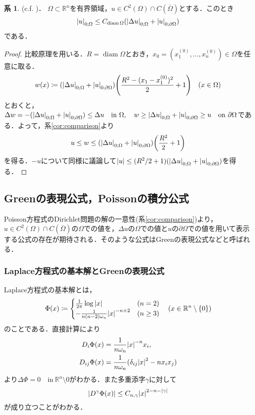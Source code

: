 \documentclass[a4paper]{ltjsarticle}
\newcommand{\Rset}{\mathbb{R}}
\newcommand{\Om}{\Omega}
\newcommand{\pOm}{\partial\Omega}
\newcommand{\Ombar}{\overline{\Omega}}
\newcommand{\inn}{\quad\text{in}\ }
\newcommand{\on}{\quad \text{on}\ }
\newcommand{\1}{\mathbbm{1}}
\DeclareMathOperator{\diam}{\mathrm{diam}}
\numberwithin{equation}{section}
\theoremstyle{definition}
\newtheorem{cor}[thm]{系}
\begin{document}
\begin{cor}\label{cor:l_infty_estimate}(c.f. \cite[Lemma 1.14]{fr})．
    $\Om\subset\Rset^n$を有界領域，$u\in C^2(\Om)\cap C(\Ombar)$とする．このとき
    \begin{equation}
        \abs{u}_{0;\Om}\leq C_{\diam\Om}(\abs{\Delta u}_{0;\Om}+\abs{u}_{0;\pOm})
    \end{equation}
    である．
\end{cor}
\begin{proof}
    比較原理を用いる．$R=\diam\Om$とおき，$x_0=(x^{(0)}_1,\ldots,x^{(0)}_n)\in\Om$を任意に取る．
    \begin{equation}
        w(x)\coloneqq (\abs{\Delta u}_{0;\Om}+\abs{u}_{0;\pOm})\qty(\frac{R^2-(x_1-x_1^{(0)})^2}{2}+1)\quad (x\in\Om)
    \end{equation}
    とおくと，$\Delta w=-(\abs{\Delta u}_{0;\Om}+\abs{u}_{0;\pOm})\leq \Delta u\inn\Omega,\quad w\geq \abs{\Delta u}_{0;\Om}+\abs{u}_{0;\pOm}\geq u\on \pOm$である．よって，系\ref{cor:comparison}より
    \begin{equation}
        u\leq w\leq (\abs{\Delta u}_{0;\Om}+\abs{u}_{0;\pOm})\qty(\frac{R^2}{2}+1)
    \end{equation}
    を得る．$-u$について同様に議論して$\abs{u}\leq (R^2/2+1)(\abs{\Delta u}_{0;\Om}+\abs{u}_{0;\pOm})$を得る．
\end{proof}
\subsection{Greenの表現公式，Poissonの積分公式}

Poisson方程式のDirichlet問題の解の一意性(系\ref{cor:comparison})より，$u\in C^2(\Omega)\cap C(\Ombar)$の$\Om$での値を，$\Delta u$の$\Om$での値と$u$の$\pOm$での値を用いて表示する公式の存在が期待される．そのような公式はGreenの表現公式などと呼ばれる．
\subsubsection{Laplace方程式の基本解とGreenの表現公式}
Laplace方程式の基本解とは，
\begin{equation}
    \Phi(x)\coloneqq \begin{cases}
        \frac{1}{2\pi}\log\abs{x} & (n=2)\\
        -\frac{1}{n(n-2)\omega_n}\abs{x}^{-n+2} & (n\geq 3)
    \end{cases}\quad (x\in \Rset^n\setminus\qty{0})
\end{equation}
のことである．直接計算により
\begin{align}
    D_i\Phi(x)&=\frac{1}{n\omega_n}\abs{x}^{-n}x_i,\\
    D_{ij}\Phi(x)&=\frac{1}{n\omega_n}(\delta_{ij}\abs{x}^2-nx_ix_j)
\end{align}
より$\Delta \Phi=0\inn\Rset^n\setminus\qty{0}$がわかる．また多重添字$\gamma$に対して
\begin{equation}
    \abs{D^\gamma \Phi(x)}\leq C_{n,\gamma}\abs{x}^{2-n-\abs{\gamma}}
\end{equation}
が成り立つことがわかる．
\end{document}
